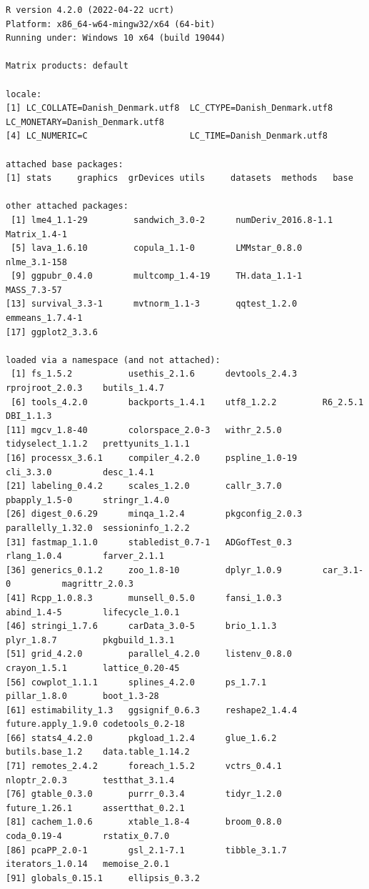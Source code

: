 \documentclass[12pt]{article}
\begin{document}
\begin{verbatim}
R version 4.2.0 (2022-04-22 ucrt)
Platform: x86_64-w64-mingw32/x64 (64-bit)
Running under: Windows 10 x64 (build 19044)

Matrix products: default

locale:
[1] LC_COLLATE=Danish_Denmark.utf8  LC_CTYPE=Danish_Denmark.utf8    LC_MONETARY=Danish_Denmark.utf8
[4] LC_NUMERIC=C                    LC_TIME=Danish_Denmark.utf8    

attached base packages:
[1] stats     graphics  grDevices utils     datasets  methods   base     

other attached packages:
 [1] lme4_1.1-29         sandwich_3.0-2      numDeriv_2016.8-1.1 Matrix_1.4-1       
 [5] lava_1.6.10         copula_1.1-0        LMMstar_0.8.0       nlme_3.1-158       
 [9] ggpubr_0.4.0        multcomp_1.4-19     TH.data_1.1-1       MASS_7.3-57        
[13] survival_3.3-1      mvtnorm_1.1-3       qqtest_1.2.0        emmeans_1.7.4-1    
[17] ggplot2_3.3.6      

loaded via a namespace (and not attached):
 [1] fs_1.5.2           usethis_2.1.6      devtools_2.4.3     rprojroot_2.0.3    butils_1.4.7      
 [6] tools_4.2.0        backports_1.4.1    utf8_1.2.2         R6_2.5.1           DBI_1.1.3         
[11] mgcv_1.8-40        colorspace_2.0-3   withr_2.5.0        tidyselect_1.1.2   prettyunits_1.1.1 
[16] processx_3.6.1     compiler_4.2.0     pspline_1.0-19     cli_3.3.0          desc_1.4.1        
[21] labeling_0.4.2     scales_1.2.0       callr_3.7.0        pbapply_1.5-0      stringr_1.4.0     
[26] digest_0.6.29      minqa_1.2.4        pkgconfig_2.0.3    parallelly_1.32.0  sessioninfo_1.2.2 
[31] fastmap_1.1.0      stabledist_0.7-1   ADGofTest_0.3      rlang_1.0.4        farver_2.1.1      
[36] generics_0.1.2     zoo_1.8-10         dplyr_1.0.9        car_3.1-0          magrittr_2.0.3    
[41] Rcpp_1.0.8.3       munsell_0.5.0      fansi_1.0.3        abind_1.4-5        lifecycle_1.0.1   
[46] stringi_1.7.6      carData_3.0-5      brio_1.1.3         plyr_1.8.7         pkgbuild_1.3.1    
[51] grid_4.2.0         parallel_4.2.0     listenv_0.8.0      crayon_1.5.1       lattice_0.20-45   
[56] cowplot_1.1.1      splines_4.2.0      ps_1.7.1           pillar_1.8.0       boot_1.3-28       
[61] estimability_1.3   ggsignif_0.6.3     reshape2_1.4.4     future.apply_1.9.0 codetools_0.2-18  
[66] stats4_4.2.0       pkgload_1.2.4      glue_1.6.2         butils.base_1.2    data.table_1.14.2 
[71] remotes_2.4.2      foreach_1.5.2      vctrs_0.4.1        nloptr_2.0.3       testthat_3.1.4    
[76] gtable_0.3.0       purrr_0.3.4        tidyr_1.2.0        future_1.26.1      assertthat_0.2.1  
[81] cachem_1.0.6       xtable_1.8-4       broom_0.8.0        coda_0.19-4        rstatix_0.7.0     
[86] pcaPP_2.0-1        gsl_2.1-7.1        tibble_3.1.7       iterators_1.0.14   memoise_2.0.1     
[91] globals_0.15.1     ellipsis_0.3.2
\end{verbatim}
\end{document}
